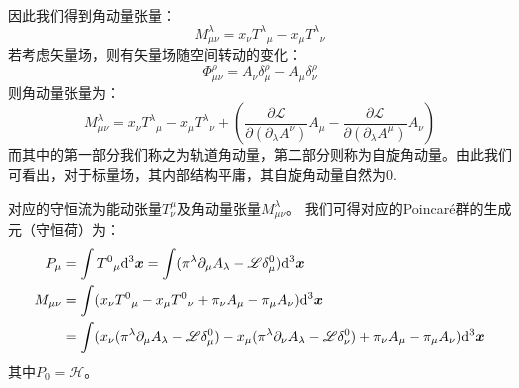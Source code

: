 \begin{itemize}
\begin{align}
	\end{align}
	因此我们得到角动量张量：
	\begin{equation}
		M^\lambda_{\mu\nu}=x_\nu {T^\lambda}_\mu-x_\mu {T^\lambda}_\nu
	\end{equation}
	若考虑矢量场，则有矢量场随空间转动的变化：
	\begin{equation}
		\Phi^\rho_{\mu\nu}=A_\nu\delta^\rho_\mu-A_\mu\delta^\rho_\nu
	\end{equation}
	则角动量张量为：
	\begin{equation}
		M^\lambda_{\mu\nu}=x_\nu {T^\lambda}_\mu-x_\mu {T^\lambda}_\nu+\left(\frac{\partial\mathscr{L}}{\partial(\partial_\lambda A^\nu)}A_\mu-\frac{\partial\mathscr{L}}{\partial(\partial_\lambda A^\mu)}A_\nu \right)
	\end{equation}
	而其中的第一部分我们称之为轨道角动量，第二部分则称为自旋角动量。由此我们可看出，对于标量场，其内部结构平庸，其自旋角动量自然为0.
\end{itemize}

对应的守恒流为能动张量$T^\mu_{\nu}$及角动量张量$M_{\mu\nu}^\lambda$。
我们可得对应的Poincar\'e群的生成元（守恒荷）为：
\begin{align}
	P_\mu&=\int {T^0}_\mu\mathrm{d}^3\boldsymbol{x}=\int(\pi^\lambda\partial_\mu A_\lambda-\mathscr{L}\delta^0_\mu)\mathrm{d}^3\boldsymbol{x}\\
	M_{\mu\nu}&=\int(x_\nu{T^0}_\mu-x_\mu{T^0}_\nu+\pi_\nu A_\mu-\pi_\mu A_\nu)\mathrm{d}^3\boldsymbol{x}\notag\\
	&=\int(x_\nu(\pi^\lambda\partial_\mu A_\lambda-\mathscr{L}\delta^0_\mu)-x_\mu(\pi^\lambda\partial_\nu A_\lambda-\mathscr{L}\delta^0_\nu)+\pi_\nu A_\mu-\pi_\mu A_\nu)\mathrm{d}^3\boldsymbol{x}
\end{align}
其中$P_0=\mathcal{H}$。


